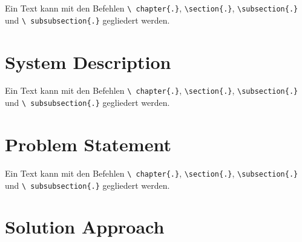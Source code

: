 Ein Text kann mit den Befehlen \texttt{\textbackslash
chapter\{.\}}, \texttt{\textbackslash section\{.\}},
\texttt{\textbackslash subsection\{.\}} und \texttt{\textbackslash
subsubsection\{.\}} gegliedert werden.

\section{System Description}
\label{sec:intro-sys_description}

Ein Text kann mit den Befehlen \texttt{\textbackslash
chapter\{.\}}, \texttt{\textbackslash section\{.\}},
\texttt{\textbackslash subsection\{.\}} und \texttt{\textbackslash
subsubsection\{.\}} gegliedert werden.

\section{Problem Statement}
\label{sec:intro_prob_statement}

Ein Text kann mit den Befehlen \texttt{\textbackslash
chapter\{.\}}, \texttt{\textbackslash section\{.\}},
\texttt{\textbackslash subsection\{.\}} und \texttt{\textbackslash
subsubsection\{.\}} gegliedert werden.

\section{Solution Approach}
\label{sec:intro_sol_approach}

